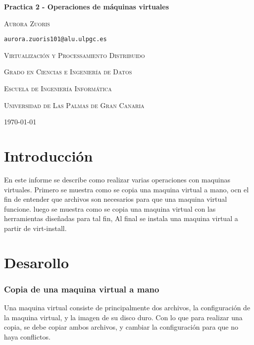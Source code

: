 \documentclass[spanish]{article}
\begin{document}
\begin{titlepage}
	\centering
	{\huge\bfseries Practica 2 - Operaciones de máquinas virtuales \par}
	\vspace{1cm}
	{\scshape\Large Aurora Zuoris \par\tt{aurora.zuoris101@alu.ulpgc.es}\par}
	\vspace{3cm}
	{\scshape\large Virtualización y Processamiento Distribuido\par}
	\vspace{1cm}
	{\scshape\large Grado en Ciencias e Ingeniería de Datos\par}
	\vspace{1cm}
	{\scshape\large Escuela de Ingeniería Informática\par}
	\vspace{1cm}
	{\scshape\large Universidad de Las Palmas de Gran Canaria\par}
	\vspace{1cm}
	{\scshape\large \today{} \par}
\end{titlepage}

\newpage

\tableofcontents

\newpage

\section{Introducción}

En este informe se describe como realizar
varias operaciones con maquinas virtuales.
Primero se muestra como se copia una maquina virtual a mano, ocn el fin 
de entender que archivos son necesarios para que una maquina virtual funcione.
luego se muestra como se copia una maquina virtual con
las herramientas diseñadas para tal fin,
Al final se instala una maquina virtual a partir de virt-install.

\section{Desarollo}

\subsubsection{Copia de una maquina virtual a mano}

Una maquina virtual consiste de principalmente dos archivos,
la configuración de la maquina virtual, y la imagen de su disco duro.
Con lo que para realizar una copia, se debe copiar ambos archivos,
y cambiar la configuración para que no haya conflictos.
\end{document}
